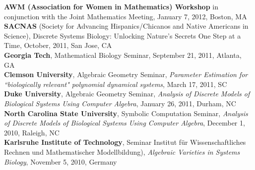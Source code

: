 \documentclass[10pt]{article}
\renewcommand{\section}[2]%
          {\pagebreak[2]\vspace{1.3\baselineskip}%
           \phantomsection\addcontentsline{toc}{section}{#1}%
           \hspace{-.05in}%
  	\marginpar{\raggedright \scshape #1} #2}
\begin{document}
  \textbf{AWM (Association for Women in Mathematics) Workshop} in conjunction with the Joint Mathematics Meeting, January 7, 2012, Boston, MA\\

  \textbf{SACNAS} (Society for Advancing Hispanics/Chicanos and Native Americans
  in Science),  Discrete Systems Biology: Unlocking Nature's Secrets One Step at a Time, October, 2011, San Jose, CA\\

  \textbf{Georgia Tech}, Mathematical Biology Seminar, September 21, 2011, Atlanta, GA\\

  \textbf{Clemson University}, Algebraic Geometry Seminar, \textit{Parameter
  Estimation for ``biologically relevant" polynomial dynamical systems}, March
  17, 2011, SC\\

  \textbf{Duke University}, Algebraic Geometry Seminar, \textit{Analysis of Discrete Models of Biological Systems Using Computer Algebra}, January 26, 2011, Durham, NC \\

  \textbf{North Carolina State University}, Symbolic Computation Seminar, \textit{Analysis of Discrete Models of Biological Systems Using Computer Algebra}, 
  December 1, 2010, Raleigh, NC \\

  \textbf{Karlsruhe Institute of Technology}, Seminar Institut f\"ur Wissenschaftliches Rechnen und Mathematischer Modellbildung), \textit{Algebraic
  Varieties in Systems Biology}, November 5, 2010, %
  Germany
  \\

  \begin{tabular*}{\textwidth}{c}
  \hline 
  \end{tabular*}


\end{document}

